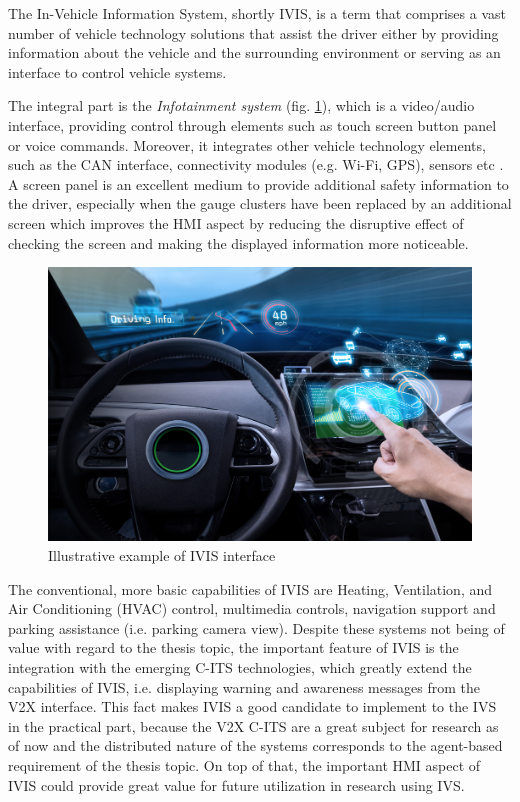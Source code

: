 \documentclass[main.tex]{subfiles}
\begin{document}
The In-Vehicle Information System, shortly IVIS, is a term that comprises a vast number of vehicle technology 
solutions that assist the driver either by providing information about the vehicle and the surrounding environment 
or serving as an interface to control vehicle systems. 

The integral part is the \emph{Infotainment system} (fig. \ref{ivis-interface}), which is a
video/audio interface, providing control through elements such as touch screen button panel or
voice commands.  Moreover, it integrates other vehicle technology elements, such as the CAN
interface, connectivity modules (e.g. Wi-Fi, GPS), sensors etc \cite{Saxena}. A screen panel is
an excellent medium to provide additional safety information to the driver, especially when the
gauge clusters have been replaced by an additional screen which improves the HMI aspect by
reducing the disruptive effect of checking the screen and making the displayed information more
noticeable. 

\begin{figure}[htbp]
    \centering
    \includegraphics[width=.8\textwidth]{ivis-dashboard.jpg}
    \caption{Illustrative example of IVIS interface \cite{Saxena}}
    \label{ivis-interface}
\end{figure}

The conventional, more basic capabilities of IVIS are Heating, Ventilation, and Air
Conditioning (HVAC) control, multimedia controls, navigation support and parking assistance
(i.e. parking camera view). Despite these systems not being of value with regard to
the thesis topic, the important feature of IVIS is the integration with the emerging C-ITS
technologies, which greatly extend the capabilities of IVIS, i.e. displaying warning and
awareness messages from the V2X interface.  This fact makes IVIS a good candidate to implement
to the IVS in the practical part, because the V2X C-ITS are a great subject for research as of
now and the distributed nature of the systems corresponds to the agent-based requirement of the
thesis topic. On top of that, the important HMI aspect of IVIS could provide great value for
future utilization in research using IVS. 
\end{document}
